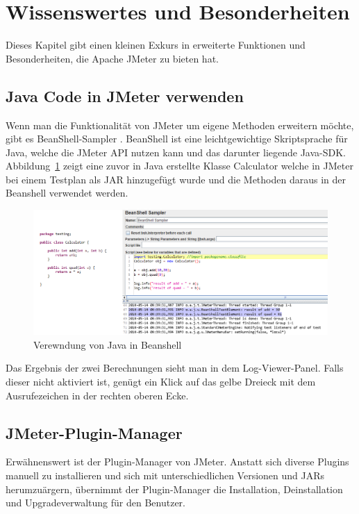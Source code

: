 \documentclass[a4paper,12pt]{article}
\begin{document}
\section{Wissenswertes und Besonderheiten}
\label{sec:wissenswertes}
Dieses Kapitel gibt einen kleinen Exkurs in erweiterte Funktionen und Besonderheiten, die Apache JMeter zu bieten hat.

\subsection{Java Code in JMeter verwenden}
Wenn man die Funktionalität von JMeter um eigene Methoden erweitern möchte, gibt es BeanShell-Sampler \cite{online:beanshell}. BeanShell ist eine leichtgewichtige Skriptsprache für Java, welche die JMeter API nutzen kann und das darunter liegende Java-SDK. Abbildung~\ref{fig:beanshell} zeigt eine zuvor in Java erstellte Klasse Calculator welche in JMeter bei einem Testplan als JAR hinzugefügt wurde und die Methoden daraus in der Beanshell verwendet werden.

\begin{figure}[htb]%
 \centering
    \includegraphics[width=1\textwidth]{bilder/beanshell.png}
  \caption{Verewndung von Java in Beanshell}
  \label{fig:beanshell}
\end{figure}

Das Ergebnis der zwei Berechnungen sieht man in dem Log-Viewer-Panel. Falls dieser nicht aktiviert ist, genügt ein Klick auf das gelbe Dreieck mit dem Ausrufezeichen in der rechten oberen Ecke.

\subsection{JMeter-Plugin-Manager}
Erwähnenswert ist der Plugin-Manager von JMeter. Anstatt sich diverse Plugins manuell zu installieren und sich mit unterschiedlichen Versionen und JARs herumzuärgern, übernimmt der Plugin-Manager die Installation, Deinstallation und Upgradeverwaltung für den Benutzer. \cite{online:jmeter}
\end{document}

